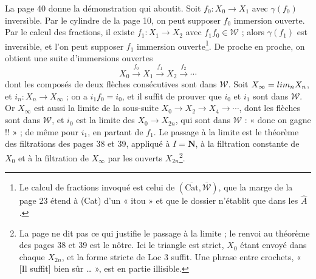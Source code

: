 \documentclass[11pt,a4paper]{article}
\begin{document}
La page 40 donne la démonstration qui aboutit. Soit $f_{0} : X_{0} \to X_{1}$
avec $\gamma(f_{0})$ inversible. Par le cylindre de la page 10, on peut
supposer $f_{0}$ immersion ouverte. Par le calcul des fractions, il existe
$f_{1} : X_{1} \to X_{2}$ avec $f_{1}f_{0} \in \mathcal{W}$ ; alors
$\gamma(f_{1})$ est inversible, et l'on peut supposer $f_{1}$ immersion
ouverte\footnote{Le calcul de fractions invoqué est celui de
$(\overline{\mathrm{Cat}}, \overline{\mathcal{W}})$, que la marge de la page
23 étend à (Cat) d'un « itou » et que le dossier n'établit que dans les
$\widehat{A}$.}. De proche en proche, on obtient une suite d'immersions
ouvertes
\[
X_{0} \xrightarrow{\ f_{0}\ } X_{1} \xrightarrow{\ f_{1}\ } X_{2}
\xrightarrow{\ f_{2}\ } \cdots
\]
dont les composés de deux flèches consécutives sont dans $\mathcal{W}$. Soit
$X_{\infty} = \varinjlim_{n} X_{n}$, et $i_{n} : X_{n} \to X_{\infty}$ ; on a
$i_{1}f_{0} = i_{0}$, et il suffit de prouver que $i_{0}$ et $i_{1}$ sont dans
$\mathcal{W}$. Or $X_{\infty}$ est aussi la limite de la sous-suite
$X_{0} \to X_{2} \to X_{4} \to \cdots$, dont les flèches sont dans
$\mathcal{W}$, et $i_{0}$ est la limite des $X_{0} \to X_{2n}$, qui sont dans
$\mathcal{W}$ : « donc on gagne !! » ; de même pour $i_{1}$, en partant de
$f_{1}$. Le passage à la limite est le théorème des filtrations des pages 38
et 39, appliqué à $I = \mathbf{N}$, à la filtration constante de $X_{0}$ et à
la filtration de $X_{\infty}$ par les ouverts $X_{2n}$\footnote{La page ne
dit pas ce qui justifie le passage à la limite ; le renvoi au théorème des
pages 38 et 39 est le nôtre. Ici le triangle est strict, $X_{0}$ étant
envoyé dans chaque $X_{2n}$, et la forme stricte de Loc 3 suffit. Une phrase
entre crochets, « [Il suffit] bien sûr … », est en partie illisible.}.
\end{document}
